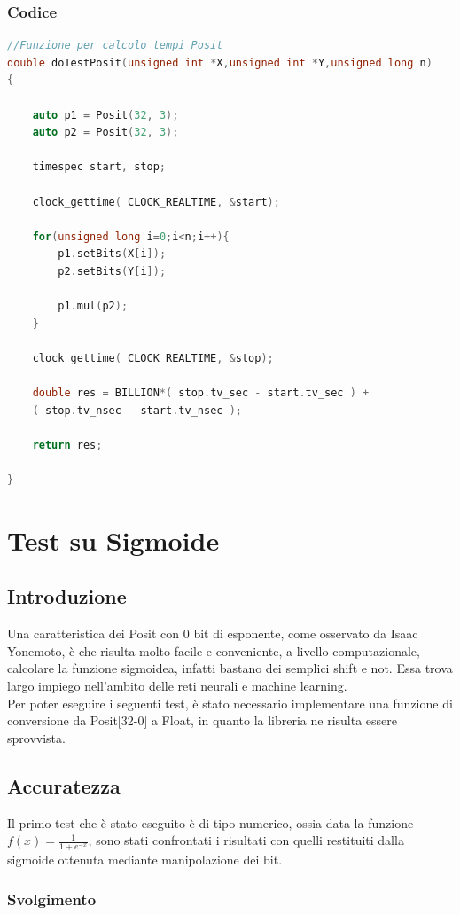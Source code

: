 \documentclass[a4paper,11pt]{article}
\begin{document}
\subsubsection{Codice}
\begin{lstlisting}[language=C++]
//Funzione per calcolo tempi Posit
double doTestPosit(unsigned int *X,unsigned int *Y,unsigned long n)
{

	auto p1 = Posit(32, 3);
	auto p2 = Posit(32, 3);    
	
	timespec start, stop;
	
	clock_gettime( CLOCK_REALTIME, &start);
	
	for(unsigned long i=0;i<n;i++){
		p1.setBits(X[i]);
		p2.setBits(Y[i]);
	
		p1.mul(p2);
	}
	
	clock_gettime( CLOCK_REALTIME, &stop);
	
	double res = BILLION*( stop.tv_sec - start.tv_sec ) + 
	( stop.tv_nsec - start.tv_nsec );
	
	return res;

}


\end{lstlisting}
\newpage
\section{Test su Sigmoide}
\subsection{Introduzione}
Una caratteristica dei Posit con 0 bit di esponente, come osservato da Isaac Yonemoto, è che risulta molto facile e conveniente, a livello computazionale, calcolare la funzione sigmoidea, infatti bastano dei semplici shift e not. Essa trova largo impiego nell'ambito delle reti neurali e machine learning.
\\Per poter eseguire i seguenti test, è stato necessario implementare una funzione di conversione da Posit[32-0] a Float, in quanto la libreria ne risulta essere sprovvista.

\subsection{Accuratezza}
Il primo test che è stato eseguito è di tipo numerico, ossia data la funzione  $ f(x) = \frac {1}{1 + e^{-x}} $, sono stati confrontati i risultati con quelli restituiti dalla sigmoide ottenuta mediante manipolazione dei bit.

\subsubsection{Svolgimento}
\end{document}
